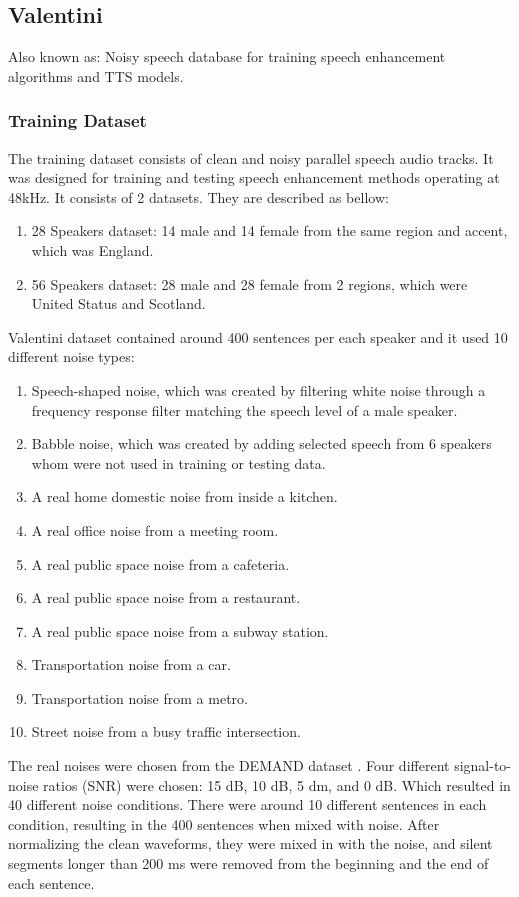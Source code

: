 \subsection{Valentini \cite{valentini2016}}
Also known as: Noisy speech database for training speech enhancement algorithms and TTS models.

\subsubsection{Training Dataset}
The training dataset consists of clean and noisy parallel speech audio tracks. It was designed for training and testing speech enhancement methods operating at 48kHz. It consists of 2 datasets. They are described as bellow:
\begin{enumerate}
    \item 28 Speakers dataset: 14 male and 14 female from the same region and accent, which was England.
    \item 56 Speakers dataset: 28 male and 28 female from 2 regions, which were United Status and Scotland.
\end{enumerate}
Valentini dataset contained around 400 sentences per each speaker and it used 10 different noise types:
\begin{enumerate}
    \item Speech-shaped noise, which was created by filtering white noise through a frequency response filter matching the speech level of a male speaker.
    \item Babble noise, which was created by adding selected speech from 6 speakers whom were not used in training or testing data.
    \item A real home domestic noise from inside a kitchen.
    \item A real office noise from a meeting room.
    \item A real public space noise from a cafeteria.
    \item A real public space noise from a restaurant.
    \item A real public space noise from a subway station.
    \item Transportation noise from a car.
    \item Transportation noise from a metro.
    \item Street noise from a busy traffic intersection.
\end{enumerate}
The real noises were chosen from the DEMAND dataset \cite{thiemann2013}.
Four different signal-to-noise ratios (SNR) were chosen: 15 dB, 10 dB, 5 dm, and 0 dB. Which resulted in 40 different noise conditions. There were around 10 different sentences in each condition, resulting in the 400 sentences when mixed with noise. After normalizing the clean waveforms, they were mixed in with the noise, and silent segments longer than 200 ms were removed from the beginning and the end of each sentence.

